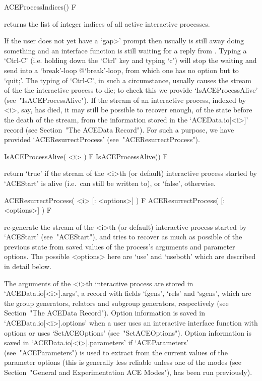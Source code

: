 \>ACEProcessIndices() F

returns the list of integer indices of all active  interactive  {\ACE}
processes.

If
the user does not yet have a `gap>'  prompt  then  usually  {\ACE}  is
still away doing something and an {\ACE} interface function  is  still
waiting for a reply from {\ACE}. Typing a `Ctrl-C' (i.e. holding  down
the `Ctrl' key and typing `c') will stop the waiting and  send  {\GAP}
into     a     `break'-loop{\undoquotes     {}
{@`break'-loop}}, from which one has no option  but  to  `quit;'.  The
typing of `Ctrl-C', in such a circumstance, usually causes the  stream
of the the interactive {\ACE} process to die; to check this we provide
`IsACEProcessAlive' (see~"IsACEProcessAlive"). If  the  stream  of  an
interactive {\ACE} process, indexed by <i>,  say,  has  died,  it  may
still be possible to recover enough, of the state before the death  of
the stream, from  the  information  stored  in  the  `ACEData.io[<i>]'
record (see Section~"The ACEData Record"). For such a purpose, we have
provided `ACEResurrectProcess' (see~"ACEResurrectProcess").

\>IsACEProcessAlive( <i> ) F
\>IsACEProcessAlive() F

return `true' if the stream of  the  <i>th  (or  default)  interactive
{\ACE} process started by  `ACEStart'  is  alive  (i.e.~can  still  be
written to), or `false', otherwise.

\>ACEResurrectProcess( <i> [: <options>] ) F
\>ACEResurrectProcess( [: <options>] ) F

re-generate the stream of the <i>th (or  default)  interactive  {\ACE}
process started by `ACEStart' (see~"ACEStart"), and tries  to  recover
as much as possible of the previous state from  saved  values  of  the
process's arguments and parameter options. The possible <options> here
are `use' and `useboth' which are described in detail below.

The arguments of the <i>th interactive {\ACE} process  are  stored  in
`ACEData.io[<i>].args', a  record  with  fields  `fgens',  `rels'  and
`sgens', which are the {\GAP} group generators, relators and  subgroup
generators, respectively (see Section~"The  ACEData  Record").  Option
information is saved in `ACEData.io[<i>].options' when a user uses  an
interactive  {\ACE}  interface   function   with   options   or   uses
`SetACEOptions' (see~"SetACEOptions"). Option information is saved  in
`ACEData.io[<i>].parameters' if `ACEParameters'  (see~"ACEParameters")
is used to extract from  {\ACE}  the  current  values  of  the  {\ACE}
parameter options (this is generally less reliable unless one  of  the
{\ACE} modes (see Section~"General and  Experimentation  ACE  Modes"),
has been run previously).

